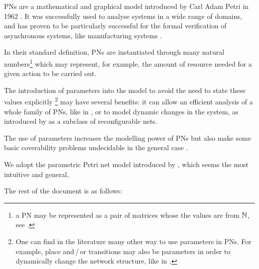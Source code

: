 \acp{PN} are a mathematical and graphical model introduced by Carl Adam Petri in 1962 \citep{Petri62,Petri66}.
It was successfully used to analyse systems in a wide range of domains, and has proven to be particularly successful for the formal verification of asynchronous systems, like manufacturing systems \cite{li2009deadlock}.

In their standard definition, \acp{PN} are instantiated through many natural numbers\footnote{\ie a \ac{PN} may be represented as a pair of matrices whose the values are from $\mathbb{N}$, see .} which may represent, for example, the amount of resource needed for a given action to be carried out.

The introduction of parameters into the model to avoid the need to state these values explicitly%
\footnote{One can find in the literature many other way to use parameters in \acp{PN}. For example, place and\,/\,or transitions may also be parameters in order to dynamically change the network structure, like in \cite{Christensen97}.}
may have several benefits:
it can allow an efficient analysis of a whole family of \acp{PN}, like in \cite{Abdulla13}, or to model dynamic changes in the system, as introduced by \cite{Badouel99} as a subclass of reconfigurable nets.

The use of parameters increases the modelling power of \acp{PN} but also make some basic coverability problems undecidable in the general case \cite{David17}.

We adopt the parametric Petri net model introduced by \cite{David17}, which seems the most intuitive and general, 

The rest of the document is as follows:

\acresetall
